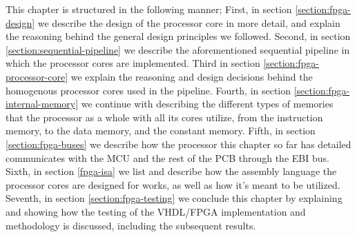 This chapter is structured in the following manner; First, in section \ref{section:fpga-design}
we describe the design of the processor core in more detail, and explain the
reasoning behind the general design principles we followed. Second, in section \ref{section:sequential-pipeline}
we describe the aforementioned sequential pipeline in which the processor cores
are implemented. Third in section \ref{section:fpga-processor-core} we explain
the reasoning and design decisions behind the homogenous processor cores used
in the pipeline. Fourth, in section \ref{section:fpga-internal-memory} we
continue with describing the different types of memories that the processor as
a whole with all its cores utilize, from the instruction memory, to the data
memory, and the constant memory. Fifth, in section \ref{section:fpga-buses} we
describe how the processor this chapter so far has detailed communicates with
the MCU and the rest of the PCB through the EBI bus. Sixth, in section \ref{fpga-isa}
we list and describe how the assembly language the processor cores are
designed for works, as well as how it's meant to be utilized. Seventh, in
section \ref{section:fpga-testing} we conclude this chapter by explaining and
showing how the testing of the  
VHDL/FPGA implementation and methodology is discussed, including the subsequent
results.







